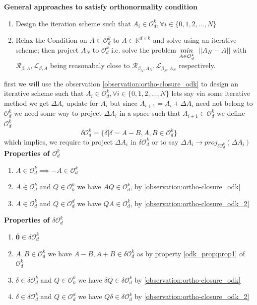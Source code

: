 \newline \newline \textbf{General approaches to satisfy orthonormality condition}
\begin{enumerate}
    \item Design the iteration scheme such that $A_i \in \mathcal{O}_d^k, \forall i \in \{0,1,2,...,N\}$
    \item Relax the Condition on $A \in \mathcal{O}_d^k$ to $A \in \mathbb{R}^{d\times k}$ and solve using an iterative scheme;  then project $A_{N}$ to $\mathcal{O}_d^k$ i.e. solve the problem $\underset{A \in \mathcal{O}_d^k}{min} \hspace{2mm} ||A_{N}-A||$ with $\mathcal{R}_{\beta, A}, \mathcal{L}_{\beta, A}$ being reasonabaly close to $\mathcal{R}_{\beta_{N}, A_{N}}, \mathcal{L}_{\beta_{N}, A_{N}}$ respectively.
\end{enumerate}
first we will use the observation \ref{observation:ortho-closure_odk} to design an iterative scheme such that $A_i \in \mathcal{O}_d^k, \forall i \in \{0,1,2,...,N\}$
\newline lets say via some iterative method we get $\Delta A_i$ update for $A_i$ but since $A_{i+1} = A_i + \Delta A_i$ need not belong to $\mathcal{O}_d^k$ we need some way to project $\Delta A_i$ in a space such that $A_{i+1} \in \mathcal{O}_d^k$
\newline we define $\mathcal{O}_d^k$
\begin{equation}
    \delta \mathcal{O}_d^k = \{ \delta | \delta = A - B, A, B \in \mathcal{O}_d^k \}
\end{equation}
which implies, we require to project $\Delta A_i$ in $\delta \mathcal{O}_d^k $ or to say $\Delta A_i \to proj_{\delta \mathcal{O}_d^k}(\Delta A_i)$
\newline \newline \textbf{Properties of $\mathcal{O}_d^k $}
\begin{enumerate}
    \item $A \in \mathcal{O}_d^k \implies -A \in \mathcal{O}_d^k$ \label{odk_prop:prop1}
    \item $A \in \mathcal{O}_d^k$ and $Q\in \mathcal{O}_k^k$ we have $A Q \in \mathcal{O}_d^k$, by \ref{observation:ortho-closure_odk}
    \item $A \in \mathcal{O}_d^k$ and $Q\in \mathcal{O}_d^d$ we have $Q A \in \mathcal{O}_d^k$, by \ref{observation:ortho-closure_odk_2}
\end{enumerate}
\textbf{Properties of $\delta \mathcal{O}_d^k $}
\begin{enumerate}
    \item $\bar{\textbf{0}} \in \delta \mathcal{O}_d^k$
    \item $A, B \in \mathcal{O}_d^k$ we have $A-B, A+B \in \delta \mathcal{O}_d^k$ as by property \ref{odk_prop:prop1} of $\mathcal{O}_d^k$
    \item $\delta \in \delta \mathcal{O}_d^k$ and $Q\in \mathcal{O}_k^k$ we have $\delta Q \in \delta \mathcal{O}_d^k$ by \ref{observation:ortho-closure_odk}
    \item $\delta \in \delta \mathcal{O}_d^k$ and $Q\in \mathcal{O}_d^d$ we have $ Q\delta \in \delta \mathcal{O}_d^k$ by \ref{observation:ortho-closure_odk_2}
\end{enumerate}

